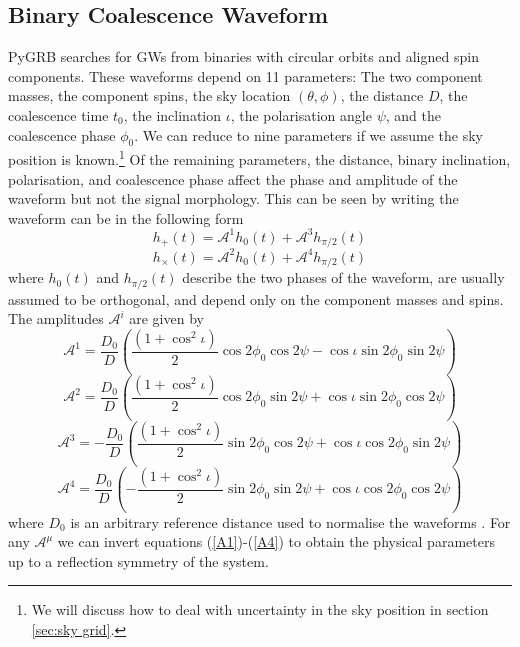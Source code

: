 \documentclass[11pt]{cuthesis}
\begin{document}
\subsection{Binary Coalescence Waveform} \label{sec:binary wf}
PyGRB searches for GWs from binaries with circular orbits and aligned spin components. These waveforms depend on 11 parameters: The two component masses, the component spins, the sky location $(\theta, \phi)$, the distance $D$, the coalescence time $t_0$, the inclination $\iota$, the polarisation angle $\psi$, and the coalescence phase $\phi_0$. We can reduce to nine parameters if we assume the sky position is known.\footnote{We will discuss how to deal with uncertainty in the sky position in section \ref{sec:sky grid}.} Of the remaining parameters, the distance, binary inclination, polarisation, and coalescence phase affect the phase and amplitude of the waveform but not the signal morphology. This can be seen by writing the waveform can be in the following form
\begin{equation} \label{hp}
h_+(t) = \mathcal{A}^1 h_0(t) + \mathcal{A}^3 h_{\pi/2}(t)
\end{equation}
\begin{equation} \label{hx}
h_\times(t) = \mathcal{A}^2 h_0(t) + \mathcal{A}^4 h_{\pi/2}(t)
\end{equation}
where $h_0(t)$ and $h_{\pi/2}(t)$ describe the two phases of the waveform, are usually assumed to be orthogonal, and depend only on the component masses and spins. The amplitudes $\mathcal{A}^i$ are given by 
\begin{equation} \label{A1}
\mathcal{A}^1 = \frac{D_0}{D} \left( \frac{(1+\cos^2 \iota)}{2} \cos 2\phi_0 \cos 2\psi -  \cos \iota \sin 2 \phi_0 \sin 2\psi \right)
\end{equation}
\begin{equation}
\mathcal{A}^2 = \frac{D_0}{D} \left( \frac{(1+\cos^2 \iota)}{2} \cos 2\phi_0 \sin 2\psi +  \cos \iota \sin 2 \phi_0 \cos 2\psi \right)
\end{equation}
\begin{equation}
\mathcal{A}^3 = -\frac{D_0}{D} \left( \frac{(1+\cos^2 \iota)}{2} \sin 2\phi_0 \cos 2\psi +  \cos \iota \cos 2 \phi_0 \sin 2\psi \right)
\end{equation}
\begin{equation} \label{A4}
\mathcal{A}^4 = \frac{D_0}{D} \left( -\frac{(1+\cos^2 \iota)}{2} \sin 2\phi_0 \sin 2\psi +  \cos \iota \cos 2 \phi_0 \cos 2\psi \right)
\end{equation}
where $D_0$ is an arbitrary reference distance used to normalise the waveforms \cite{pygrb_harry, Cornish_2007}. For any $\mathcal{A}^\mu$ we can invert equations (\ref{A1})-(\ref{A4}) to obtain the physical parameters up to a reflection symmetry of the system.
\end{document}
